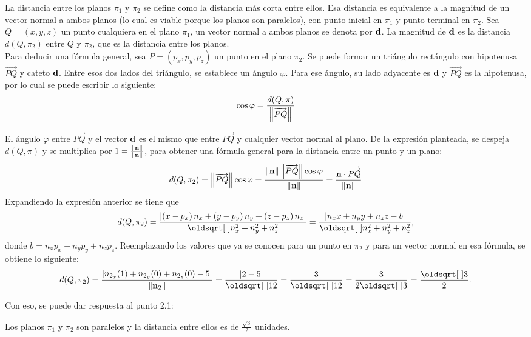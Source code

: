 \documentclass{fmbvecto}
\begin{document}
\begin{problema}
La distancia entre los planos \(\pi_1\) y \(\pi_2\) se define como la distancia más corta entre ellos. Esa distancia es equivalente a la magnitud de un vector normal a ambos planos (lo cual es viable porque los planos son paralelos), con punto inicial en \(\pi_1\) y punto terminal en \(\pi_2\). Sea \( Q=(x, y, z) \) un punto cualquiera en el plano \(\pi_1\), un vector normal a ambos planos se denota por \(\boldsymbol{{\mathbf{d}}}\). La magnitud de \(\boldsymbol{{\mathbf{d}}}\) es la distancia \( d(Q, \pi_2) \) entre \(Q\) y \(\pi_2\), que es la distancia entre los planos. \\

Para deducir una fórmula general, sea \( P=\left(p_{x}, p_{y}, p_{z}\right) \) un punto en el plano \( \pi_2 \). Se puede formar un triángulo rectángulo con hipotenusa \( \overrightarrow{P Q} \) y cateto \(\boldsymbol{{\mathbf{d}}}\). Entre esos dos lados del triángulo, se establece un ángulo \( \varphi \). Para ese ángulo, su lado adyacente es \(\boldsymbol{{\mathbf{d}}}\) y \(\overrightarrow{P Q}\) es la hipotenusa, por lo cual se puede escribir lo siguiente:
\[ \cos \varphi  =\frac{d(Q, \pi)}{\left\lVert \overrightarrow{P Q} \right\rVert} \]

El ángulo \( \varphi \) entre \( \overrightarrow{P Q} \) y el vector \(\boldsymbol{{\mathbf{d}}}\) es el mismo que entre \( \overrightarrow{P Q} \) y cualquier vector normal al plano. De la expresión planteada, se despeja \( d(Q, \pi) \) y se multiplica por \( 1=\frac{\left\lVert \boldsymbol{{\mathbf{n}}} \right\rVert}{\left\lVert \boldsymbol{{\mathbf{n}}} \right\rVert} \), para obtener una fórmula general para la distancia entre un punto y un plano:
\[ d(Q, \pi_2)=\left\lVert \overrightarrow{P Q} \right\rVert \cos \varphi=\frac{\left\lVert \boldsymbol{{\mathbf{n}}} \right\rVert\left\lVert \overrightarrow{P Q} \right\rVert \cos \varphi}{\left\lVert \boldsymbol{{\mathbf{n}}} \right\rVert}=\frac{\boldsymbol{{\mathbf{n}}} \cdot \overrightarrow{P Q}}{\left\lVert \boldsymbol{{\mathbf{n}}} \right\rVert} \]
Expandiendo la expresión anterior se tiene que
\[ d(Q, \pi_2)=\frac{\abs{\left(x-p_{x}\right) n_{x}+\left(y-p_{y}\right) n_{y}+\left(z-p_{z}\right) n_{z}}}{\sqrt{n_{x}^{2}+n_{y}^{2}+n_{z}^{2}}}=\frac{\abs{n_{x} x+n_{y} y+n_{z} z-b}}{\sqrt{n_{x}^{2}+n_{y}^{2}+n_{z}^{2}}},\]
donde \(b=n_{x} p_{x}+n_{y} p_{y}+n_{z} p_{z} \).
Reemplazando los valores que ya se conocen para un punto en \( \pi_2 \) y para un vector normal en esa fórmula, se obtiene lo siguiente:
\[ d(Q, \pi_2)= \frac{|n_{2_x}(1) + n_{2_y}(0) + n_{2_z}(0) - 5|}{\norm{\bvec{n}_2}} = \frac{|2-5|}{\sqrt{12}} = \frac{3}{\sqrt{12}} = \frac{3}{2\sqrt{3}} = \frac{\sqrt{3}}{2} . \]

Con eso, se puede dar respuesta al punto 2.1:
\begin{gbox}
    Los planos \(\pi_1\) y \(\pi_2\) son paralelos y la distancia entre ellos es de \(\frac{\sqrt{3}}{2}\) unidades.
\end{gbox}


\end{problema}
\end{document}
